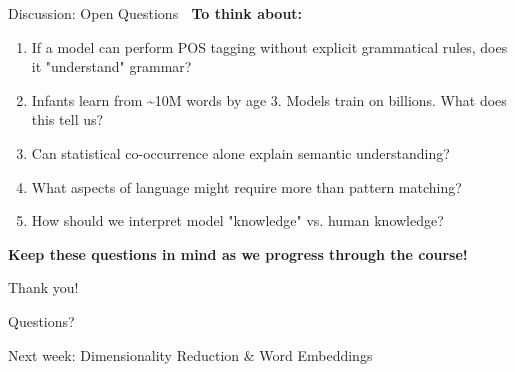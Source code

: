\documentclass[aspectratio=169]{beamer}
\begin{document}
\begin{frame}{Discussion: Open Questions 💭}
    \textbf{To think about:}

    \begin{enumerate}\setlength{\itemsep}{0pt}
        \item If a model can perform POS tagging without explicit grammatical rules, does it "understand" grammar?

        \item Infants learn from \textasciitilde 10M words by age 3. Models train on billions. What does this tell us?

        \item Can statistical co-occurrence alone explain semantic understanding?

        \item What aspects of language might require more than pattern matching?

        \item How should we interpret model "knowledge" vs. human knowledge?
    \end{enumerate}

    \vspace{1em}
    \textbf{Keep these questions in mind as we progress through the course!}
\end{frame}

\begin{frame}[standout]
    \Huge Thank you! 🎉

    \vspace{1em}

    \large Questions?

    \vspace{1em}

    \normalsize
    Next week: Dimensionality Reduction \& Word Embeddings
\end{frame}
\end{document}
